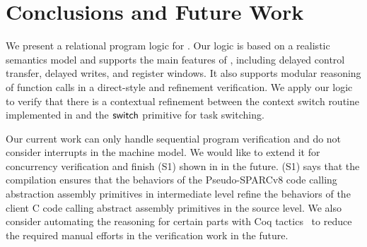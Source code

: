 \section{Conclusions and Future Work}
\label{sec:conclusion}
We present a relational program logic for \sparc.
Our logic is based on a realistic semantics
model and supports the main features of \sparc,
including delayed control transfer, delayed writes,
and register windows.
It also supports modular reasoning of
function calls in a direct-style and
refinement verification.
We apply our logic to verify
that there is a contextual refinement between
the context switch routine implemented
in \sparc{} and 
the $\mathsf{switch}$ primitive for task switching.

Our current work can only handle
sequential \sparc{} program verification and
do not consider interrupts in the machine model.
We would like to extend it for concurrency verification
and finish {\color{blue} (S1)} shown in
\Fig{\ref{fig:idea to establish contextual refinement}} 
in the future. 
{\color{blue} (S1)} says that 
the compilation ensures that the behaviors
of the Pseudo-SPARCv8 code calling abstraction assembly
primitives in intermediate level refine
the behaviors of
the client C code calling abstract assembly primitives
in the source level. 
We also consider automating the reasoning
for certain parts with Coq tactics~\cite{practical-tactics} 
to reduce the required manual efforts in the verification work
in the future.